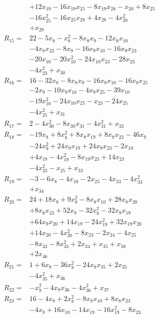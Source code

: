 \begin{align*}
&+12x_{19} -16x_{19}x_{25} -8x_{19}x_{28} -x_{20} +8x_{25}\\
&-16x_{25}^{2} -16x_{25}x_{28} +4x_{28} -4x_{28}^{2}\\
&+x_{29}\\[3pt]
R_{15}={}&22 -5x_{8} -x_{8}^{2} -8x_{8}x_{9} -12x_{8}x_{10}\\
&-4x_{8}x_{23} -8x_{9} -16x_{9}x_{10} -16x_{9}x_{23}\\
&-20x_{10} -20x_{10}^{2} -24x_{10}x_{23} -28x_{23}\\
&-4x_{23}^{2} +x_{30}\\[3pt]
R_{16}={}&16 -32x_{8} -8x_{8}x_{9} -16x_{8}x_{10} -16x_{8}x_{25}\\
&-2x_{9} -10x_{9}x_{10} -4x_{9}x_{25} -39x_{10}\\
&-19x_{10}^{2} -24x_{10}x_{25} -x_{23} -24x_{25}\\
&-4x_{25}^{2} +x_{31}\\[3pt]
R_{17}={}&2 -4x_{30}^{2} -8x_{30}x_{31} -4x_{31}^{2} +x_{32}\\[3pt]
R_{18}={}&-19x_{8} +8x_{8}^{2} +8x_{8}x_{19} +8x_{8}x_{23} -46x_{9}\\
&-24x_{9}^{2} +24x_{9}x_{19} +24x_{9}x_{23} -2x_{10}\\
&+4x_{19} -4x_{19}^{2} -8x_{19}x_{23} +14x_{23}\\
&-4x_{23}^{2} -x_{25} +x_{33}\\[3pt]
R_{19}={}&-3 -6x_{8} -4x_{10} -2x_{25} -4x_{33} -4x_{33}^{2}\\
&+x_{34}\\[3pt]
R_{20}={}&24 +18x_{8} +9x_{8}^{2} -8x_{8}x_{10} +28x_{8}x_{20}\\
&+8x_{8}x_{23} +52x_{9} -32x_{9}^{2} -32x_{9}x_{19}\\
&+64x_{9}x_{20} +14x_{19} -24x_{19}^{2} +32x_{19}x_{20}\\
&+14x_{20} -4x_{20}^{2} -8x_{23} -2x_{24} -4x_{25}\\
&-8x_{33} -8x_{33}^{2} +2x_{34} +x_{35} +x_{38}\\
&+2x_{46}\\[3pt]
R_{21}={}&1 +6x_{8} -36x_{8}^{2} -24x_{8}x_{35} +2x_{35}\\
&-4x_{35}^{2} +x_{36}\\[3pt]
R_{22}={}&-x_{9}^{2} -4x_{9}x_{36} -4x_{36}^{2} +x_{37}\\[3pt]
R_{23}={}&16 -4x_{8} +2x_{8}^{2} -8x_{8}x_{10} +8x_{8}x_{23}\\
&-4x_{9} +16x_{10} -14x_{19} -16x_{19}^{2} -8x_{23}\\

\end{align*}
